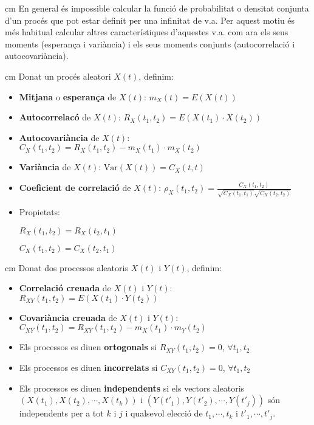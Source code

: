 \documentclass{article}
\begin{document}
 cm
En general \'es impossible calcular la funci\'o de probabilitat o densitat conjunta
d'un proc\'es que pot estar definit per una infinitat de v.a. Per aquest motiu \'es
m\'es habitual calcular altres caracter\'istiques d'aquestes v.a. com ara els 
seus moments (esperan\c{c}a i vari\`ancia) i els seus moments conjunts (autocorrelaci\'o
i autocovari\`ancia).

 cm
Donat un proc\'es aleatori $X(t)$, definim:
\begin{itemize}
\item \textbf{Mitjana} o \textbf{esperan\c{c}a} de $X(t)$: $m_X(t)=E(X(t))$
\item \textbf{Autocorrelac\'o} de $X(t)$: $R_X(t_1, t_2)=E(X(t_1) \cdot X(t_2))$
\item \textbf{Autocovari\`ancia} de $X(t)$: $C_X(t_1, t_2)=R_X(t_1, t_2)- m_X(t_1) \cdot m_X(t_2)$
\item \textbf{Vari\`ancia} de $X(t)$: $\mathrm{Var}(X(t))=C_X(t, t)$
\item \textbf{Coeficient de correlaci\'o} de $X(t)$: 
$\displaystyle \rho_X(t_1, t_2)=\frac{C_X(t_1, t_2)}{\sqrt{C_X(t_1, t_1)} \sqrt{C_X(t_2, t_2)}}$
\item Propietats: 

 $R_X(t_1, t_2)=R_X(t_2, t_1)$

 $C_X(t_1, t_2)=C_X(t_2, t_1)$
\end{itemize}

 cm
Donat dos processos aleatoris $X(t)$ i $Y(t)$, definim:
\begin{itemize}
\item \textbf{Correlaci\'o creuada} de $X(t)$ i $Y(t)$: $R_{XY}(t_1, t_2)=E(X(t_1) \cdot Y(t_2))$
\item \textbf{Covari\`ancia creuada} de $X(t)$ i $Y(t)$: 
$C_{XY}(t_1, t_2)=R_{XY}(t_1, t_2)-m_X(t_1) \cdot m_Y(t_2)$
\item Els processos es diuen \textbf{ortogonals} si $R_{XY}(t_1, t_2)=0$, $\forall t_1, t_2$
\item Els processos es diuen \textbf{incorrelats} si $C_{XY}(t_1, t_2)=0$, $\forall t_1, t_2$
\item Els processos es diuen \textbf{independents} si 
els vectors aleatoris $(X(t_1), X(t_2), \cdots, X(t_k))$ i
$(Y(t'_1), Y(t'_2), \cdots, Y(t'_j))$ s\'on independents per a tot $k$ i $j$
i qualsevol elecci\'o de $t_1, \cdots, t_k$ i $t'_1, \cdots, t'_j$.
\end{itemize}
\end{document}
